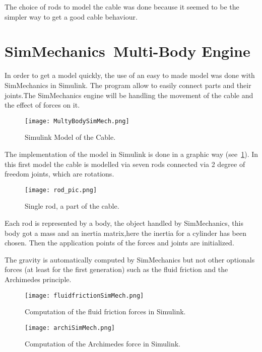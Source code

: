 The choice of rods to model the cable was done because it seemed to be the simpler
way to get a good cable behaviour.

\section{SimMechanics\texttrademark ~Multi-Body Engine}

In order to get a model quickly, the use of an easy to made model was done with SimMechanics in Simulink.
The program allow to easily connect parts and their joints.The SimMechanics engine will be handling the movement of the cable and the effect of forces on it.

\begin{figure}[H]
\centering
    \texttt{[image: MultyBodySimMech.png]}
    \caption{Simulink Model of the Cable.}
    \label{fig:SimulinkFullMod}
\end{figure}

The implementation of the model in Simulink is done in a graphic way (see~\ref{fig:SimulinkFullMod}). In
this first model the cable is modelled via seven rods connected via 2 degree of freedom joints, which are rotations.

\begin{figure}[H]
\centering
    \texttt{[image: rod\_pic.png]}
    \caption{Single rod, a part of the cable.}
    \label{fig:SingleRod}
\end{figure}

Each rod is represented by a body, the object handled by SimMechanics, this body got a mass and an inertia matrix,here the inertia for a cylinder has been chosen. Then the application points of the forces and joints are
initialized.

The gravity is automatically computed by SimMechanics but not other optionals forces (at least for the first generation) such as the fluid friction and the Archimedes principle. 

\begin{figure}[H]
\centering
    \begin{minipage}[b]{0.4\textwidth}
    \centering
    \texttt{[image: fluidfrictionSimMech.png]}
    \caption{Computation of the fluid friction forces in Simulink.}
    \label{fig:fluidSimMech}
    \end{minipage}
    \hfill
    \begin{minipage}[b]{0.4\textwidth}
    \centering
    \texttt{[image: archiSimMech.png]}
    \caption{Computation of the Archimedes force in Simulink.}
    \label{fig:archSimMech}
    \end{minipage}
\end{figure}


